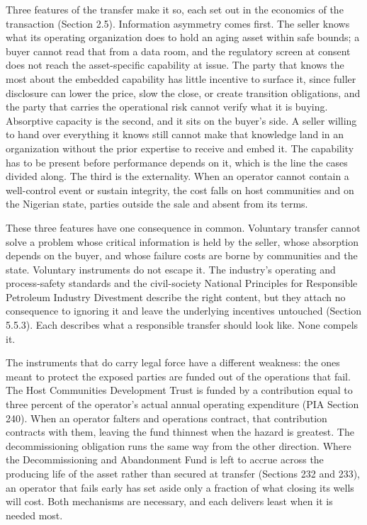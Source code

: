 Three features of the transfer make it so, each set out in the economics
of the transaction (Section 2.5). Information asymmetry comes first. The
seller knows what its operating organization does to hold an aging asset
within safe bounds; a buyer cannot read that from a data room, and the
regulatory screen at consent does not reach the asset-specific
capability at issue. The party that knows the most about the embedded
capability has little incentive to surface it, since fuller disclosure
can lower the price, slow the close, or create transition obligations,
and the party that carries the operational risk cannot verify what it is
buying. Absorptive capacity is the second, and it sits on the buyer's
side. A seller willing to hand over everything it knows still cannot
make that knowledge land in an organization without the prior expertise
to receive and embed it. The capability has to be present before
performance depends on it, which is the line the cases divided along.
The third is the externality. When an operator cannot contain a
well-control event or sustain integrity, the cost falls on host
communities and on the Nigerian state, parties outside the sale and
absent from its terms.

These three features have one consequence in common. Voluntary transfer
cannot solve a problem whose critical information is held by the seller,
whose absorption depends on the buyer, and whose failure costs are borne
by communities and the state. Voluntary instruments do not escape it.
The industry's operating and process-safety standards and the
civil-society National Principles for Responsible Petroleum Industry
Divestment describe the right content, but they attach no consequence to
ignoring it and leave the underlying incentives untouched (Section
5.5.3). Each describes what a responsible transfer should look like.
None compels it.

The instruments that do carry legal force have a different weakness: the
ones meant to protect the exposed parties are funded out of the
operations that fail. The Host Communities Development Trust is funded
by a contribution equal to three percent of the operator's actual annual
operating expenditure (PIA Section 240). When an operator falters and
operations contract, that contribution contracts with them, leaving the
fund thinnest when the hazard is greatest. The decommissioning
obligation runs the same way from the other direction. Where the
Decommissioning and Abandonment Fund is left to accrue across the
producing life of the asset rather than secured at transfer (Sections
232 and 233), an operator that fails early has set aside only a fraction
of what closing its wells will cost. Both mechanisms are necessary, and
each delivers least when it is needed most.

